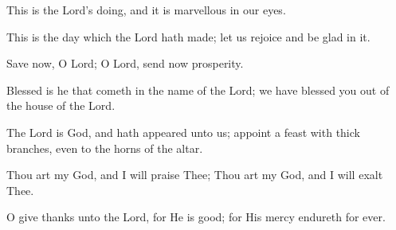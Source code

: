 This is the Lord's doing, and it is marvellous in our eyes.

This is the day which the Lord hath made; let us rejoice and be glad in it.

Save now, O Lord; O Lord, send now prosperity.

Blessed is he that cometh in the name of the Lord; we have blessed you out of the house of the Lord.

The Lord is God, and hath appeared unto us; appoint a feast with thick branches, even to the horns of the altar.

Thou art my God, and I will praise Thee; Thou art my God, and I will exalt Thee.

O give thanks unto the Lord, for He is good; for His mercy endureth for ever.
